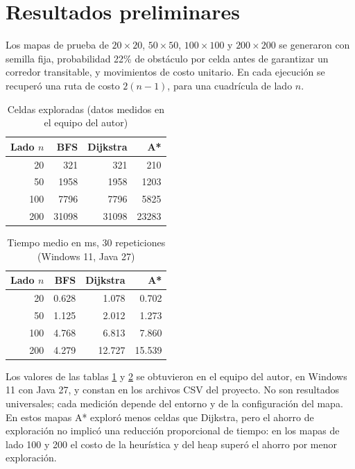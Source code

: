 \documentclass[conference]{IEEEtran}
\begin{document}
\section{Resultados preliminares}
Los mapas de prueba de $20\times20$, $50\times50$, $100\times100$ y $200\times200$ se generaron con semilla fija, probabilidad 22\% de obst\'aculo por celda antes de garantizar un corredor transitable, y movimientos de costo unitario. En cada ejecuci\'on se recuper\'o una ruta de costo $2(n-1)$, para una cuadr\'icula de lado $n$.

\begin{table}[H]
\caption{Celdas exploradas (datos medidos en el equipo del autor)}
\label{tab:explored}
\centering
\begin{tabular}{@{}rrrr@{}}
\toprule
Lado $n$ & BFS & Dijkstra & A* \\
\midrule
20 & 321 & 321 & 210 \\
50 & 1958 & 1958 & 1203 \\
100 & 7796 & 7796 & 5825 \\
200 & 31098 & 31098 & 23283 \\
\bottomrule
\end{tabular}
\end{table}

\begin{table}[H]
\caption{Tiempo medio en ms, 30 repeticiones (Windows 11, Java 27)}
\label{tab:times}
\centering
\begin{tabular}{@{}rrrr@{}}
\toprule
Lado $n$ & BFS & Dijkstra & A* \\
\midrule
20 & 0.628 & 1.078 & 0.702 \\
50 & 1.125 & 2.012 & 1.273 \\
100 & 4.768 & 6.813 & 7.860 \\
200 & 4.279 & 12.727 & 15.539 \\
\bottomrule
\end{tabular}
\end{table}

Los valores de las tablas \ref{tab:explored} y \ref{tab:times} se obtuvieron en el equipo del autor, en Windows 11 con Java 27, y constan en los archivos CSV del proyecto. No son resultados universales; cada medici\'on depende del entorno y de la configuraci\'on del mapa. En estos mapas A* explor\'o menos celdas que Dijkstra, pero el ahorro de exploraci\'on no implic\'o una reducci\'on proporcional de tiempo: en los mapas de lado 100 y 200 el costo de la heur\'istica y del heap super\'o el ahorro por menor exploraci\'on.
\end{document}
